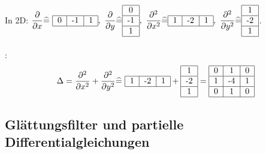     In 2D: $\displaystyle \frac{\partial}{\partial x} \widehat = \ \begin{tabular}{|c|c|c|}
        \hline
        0 & -1 & 1\\
        \hline
    \end{tabular}, \ \frac{\partial}{\partial y} \widehat = \begin{tabular}{|c|}
        \hline
        0\\
        \hline
        -1\\
        \hline
        1\\
        \hline
    \end{tabular}, \ \frac{\partial^2}{\partial x^2} \widehat = \begin{tabular}{|c|c|c|}
        \hline
        1 & -2 & 1\\
        \hline
    \end{tabular}, \ \frac{\partial^2}{\partial y^2} \widehat = \begin{tabular}{|c|}
        \hline
        1\\
        \hline
        -2\\
        \hline
        1\\
        \hline
    \end{tabular}$.\\
    \ \\
    :
    \[\Delta = \frac{\partial^2}{\partial x^2} + \frac{\partial^2}{\partial y^2} \widehat = \ \begin{tabular}{|c|c|c|}
        \hline
        1 & -2 & 1\\
        \hline
    \end{tabular} + \begin{tabular}{|c|}
        \hline
        1\\
        \hline
        -2\\
        \hline
        1\\
        \hline
    \end{tabular} = \begin{tabular}{|c|c|c|}
        \hline
         0 & 1 & 0\\
        \hline
        1 & -4 & 1\\
        \hline
         0 & 1 & 0\\
        \hline
    \end{tabular}\]

    \subsection{Glättungsfilter und partielle Differentialgleichungen}

